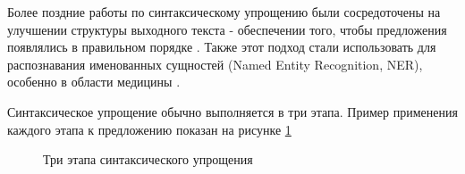 Более поздние работы по синтаксическому упрощению были сосредоточены на улучшении структуры выходного текста - обеспечении того, чтобы предложения появлялись в правильном порядке \cite{siddharthan_syntactic_2006}. Также этот подход стали использовать для распознавания именованных сущностей (Named Entity Recognition, NER), особенно в области медицины \cite{jonnalagadda_biosimplify_2010}.

Синтаксическое упрощение обычно выполняется в три этапа. Пример применения каждого этапа к предложению показан на рисунке \ref{fig:3steps}

\begin{figure}[h!]
	
	
	\caption{Три этапа синтаксического упрощения}
	
	\label{fig:3steps}
	
\end{figure}


%


